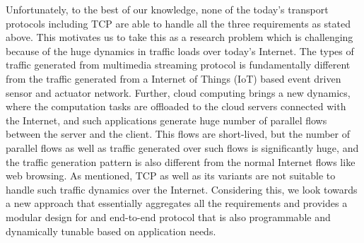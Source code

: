 Unfortunately, to the best of our knowledge, none of the today's transport protocols including TCP are able to handle all the three requirements as stated above. This motivates us to take this as a research problem which is challenging because of the huge dynamics in traffic loads over today's Internet. The types of traffic generated from multimedia streaming protocol is fundamentally different from the traffic generated from a Internet of Things (IoT) based event driven sensor and actuator network. Further, cloud computing brings a new dynamics, where the computation tasks are offloaded to the cloud servers connected with the Internet, and such applications generate huge number of parallel flows between the server and the client. This flows are short-lived, but the number of parallel flows as well as traffic generated over such flows is significantly huge, and the traffic generation pattern is also different from the normal Internet flows like web browsing. As mentioned, TCP as well as its variants are not suitable to handle such traffic dynamics over the Internet. Considering this, we look towards a new approach that essentially aggregates all the requirements and provides a modular design for and end-to-end protocol that is also programmable and dynamically tunable based on application needs. 

